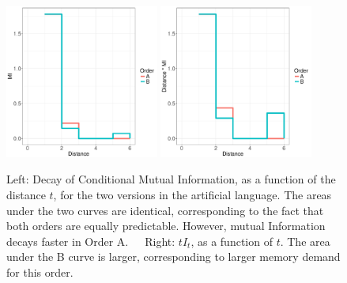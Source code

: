 \begin{figure}
\includegraphics[width=0.45\textwidth]{../code/toy/figures/toy-mis.pdf}
\includegraphics[width=0.45\textwidth]{../code/toy/figures/toy-t-mis.pdf}
%
	\caption{Left: Decay of Conditional Mutual Information, as a function of the distance $t$, for the two versions in the artificial language. The areas under the two curves are identical, corresponding to the fact that both orders are equally predictable. However, mutual Information decays faster in Order A.\ \ \ Right: $t I_t$, as a function of $t$. The area under the B curve is larger, corresponding to larger memory demand for this order.}\label{fig:toy-mis}
\end{figure}
%
%
%
%
%
%
%
%
%
%
%

